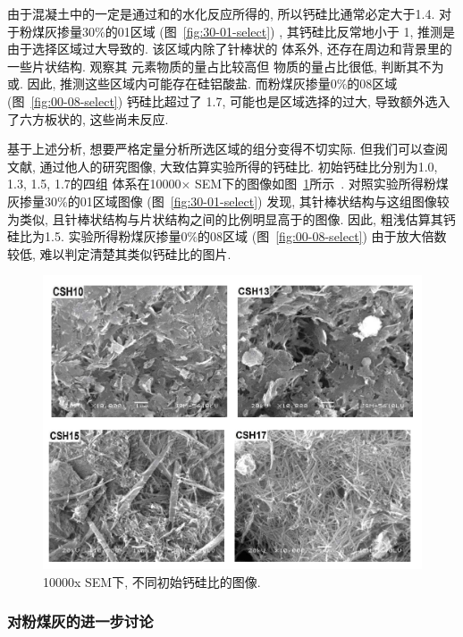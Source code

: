 由于混凝土中的一定是通过和的水化反应所得的, 所以钙硅比通常必定大于\num{1.4}. 对于粉煤灰掺量30\%的01区域 (图~\ref{fig:30-01-select}) , 其钙硅比反常地小于 \num{1}, 推测是由于选择区域过大导致的. 该区域内除了针棒状的 体系外, 还存在周边和背景里的一些片状结构. 观察其 元素物质的量占比较高但  物质的量占比很低, 判断其不为或. 因此, 推测这些区域内可能存在硅铝酸盐. 而粉煤灰掺量0\%的08区域 (图~\ref{fig:00-08-select}) 钙硅比超过了 \num{1.7}, 可能也是区域选择的过大, 导致额外选入了六方板状的, 这些尚未反应.

基于上述分析, 想要严格定量分析所选区域的组分变得不切实际. 但我们可以查阅文献, 通过他人的研究图像, 大致估算实验所得的钙硅比. 初始钙硅比分别为\num{1.0}, \num{1.3}, \num{1.5}, \num{1.7}的四组  体系在10000× SEM下的图像如图~\ref{fig:lv_csh}所示~\cite{lv_ca}. 对照实验所得粉煤灰掺量30\%的01区域图像 (图~\ref{fig:30-01-select}) 发现, 其针棒状结构与这组图像较为类似, 且针棒状结构与片状结构之间的比例明显高于的图像. 因此, 粗浅估算其钙硅比为\num{1.5}. 实验所得粉煤灰掺量0\%的08区域 (图~\ref{fig:00-08-select}) 由于放大倍数较低, 难以判定清楚其类似钙硅比的图片.

\begin{figure}
  \centering
  \includegraphics[width=\linewidth]{figures/exp3/lv_csh.png}
  \caption{10000x SEM下, 不同初始钙硅比的图像. }
  \label{fig:lv_csh}
\end{figure}

\subsubsection{对粉煤灰的进一步讨论}\label{sec:fa_supp}

